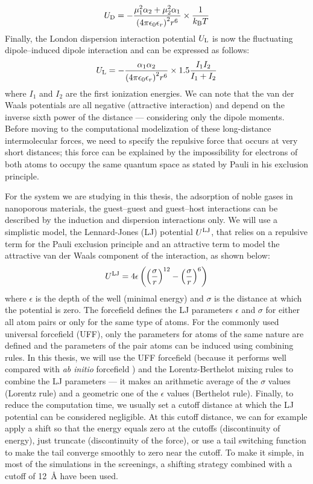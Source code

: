 \documentclass[main.tex]{subfiles}
\begin{document}
\begin{equation}\label{eq:debye}
  U_{\text{D}} = -\dfrac{\mu_1^2\alpha_2 + \mu_2^2\alpha_1}{{(4\pi\epsilon_0\epsilon_r)}^2r^6}\times\dfrac{1}{k_{\text{B}}T}
\end{equation}
Finally, the London dispersion interaction potential $U_{\text{L}}$ is now the fluctuating dipole--induced dipole interaction and can be expressed as follows:
\begin{equation}\label{eq:london}
  U_{\text{L}} = -\dfrac{\alpha_1\alpha_2}{{(4\pi\epsilon_0\epsilon_r)}^2r^6}\times1.5\dfrac{I_1 I_2}{I_1+I_2}
\end{equation}
where $I_1$ and $I_2$ are the first ionization energies. We can note that the van der Waals potentials are all negative (attractive interaction) and depend on the inverse sixth power of the distance --- considering only the dipole moments. Before moving to the computational modelization of these long-distance intermolecular forces, we need to specify the repulsive force that occurs at very short distances; this force can be explained by the impossibility for electrons of both atoms to occupy the same quantum space as stated by Pauli in his exclusion principle.

For the system we are studying in this thesis, the adsorption of noble gases in nanoporous materials, the guest--guest and guest--host interactions can be described by the induction and dispersion interactions only. We will use a simplistic model, the Lennard-Jones (LJ) potential $U^{\text{LJ}}$,\autocite{LJ_1924} that relies on a repulsive term for the Pauli exclusion principle and an attractive term to model the attractive van der Waals component of the interaction, as shown below:
\begin{equation}\label{eq:LJ}
  U^{\text{LJ}} = 4\epsilon \left({\left(\dfrac{\sigma}{r}\right)}^{12} - {\left(\dfrac{\sigma}{r}\right)}^{6}\right)
\end{equation}
where $\epsilon$ is the depth of the well (minimal energy) and $\sigma$ is the distance at which the potential is zero. The forcefield defines the LJ parameters $\epsilon$ and $\sigma$ for either all atom pairs or only for the same type of atoms. For the commonly used universal forcefield (UFF),\autocite{rappe1992} only the parameters for atoms of the same nature are defined and the parameters of the pair atoms can be induced using combining rules. In this thesis, we will use the UFF forcefield (because it performs well compared with \emph{ab initio} forcefield \autocite{McDaniel_2015}) and the Lorentz-Berthelot mixing rules to combine the LJ parameters --- it makes an arithmetic average of the $\sigma$ values (Lorentz rule) and a geometric one of the $\epsilon$ values (Berthelot rule). Finally, to reduce the computation time, we usually set a cutoff distance at which the LJ potential can be considered negligible. At this cutoff distance, we can for example apply a shift so that the energy equals zero at the cutoffs (discontinuity of energy), just truncate (discontinuity of the force), or use a tail switching function to make the tail converge smoothly to zero near the cutoff. To make it simple, in most of the simulations in the screenings, a shifting strategy combined with a cutoff of \SI{12}{\angstrom} have been used.
\end{document}
